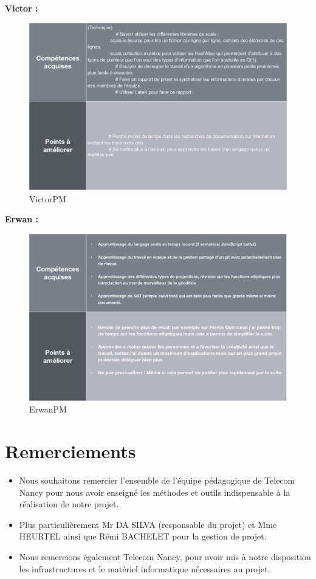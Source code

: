 \documentclass{article}
\begin{document}
    \textbf{Victor :}
    \begin{figure}[H]
        \centering
        \includegraphics[scale=0.45]{VictorPM.png}
        \caption{VictorPM}
        \label{fig:victorpm}
    \end{figure}
    
    \newpage
    
    \textbf{Erwan :}
    \begin{figure}[H]
        \centering
        \includegraphics[scale=0.45]{ErwanPM.png}
        \caption{ErwanPM}
        \label{fig:erwanpm}
    \end{figure}
    
    

\section{ Remerciements}


\begin{itemize}
    \item Nous souhaitons remercier l’ensemble de l’équipe pédagogique de Telecom Nancy pour nous avoir enseigné les méthodes et outils indispensable à la réalisation de notre projet.
    \item Plus particulièrement Mr DA SILVA (responsable du projet) et Mme HEURTEL ainsi que Rémi BACHELET pour la gestion de projet.
    \item Nous remercions également Telecom Nancy, pour avoir mis à notre disposition les infrastructures et le matériel informatique nécessaires au projet.
    \end{itemize}
\end{document}
